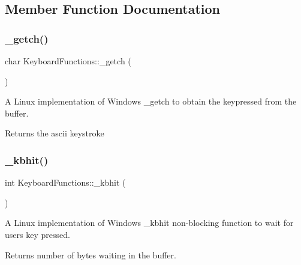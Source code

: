\subsection{Member Function Documentation}
\mbox{\label{class_keyboard_functions_acdaa4ed7d68dd3faf4103fc8112c768b}} 
\subsubsection{\texorpdfstring{\_getch()}{\_getch()}}
{\footnotesize\ttfamily char Keyboard\+Functions\+::\+\_\+getch (\begin{DoxyParamCaption}{ }\end{DoxyParamCaption})\hspace{0.3cm}{\ttfamily [private]}}



A Linux implementation of Windows \+\_\+getch to obtain the keypressed from the buffer. 

\begin{DoxyReturn}{Returns}
the ascii keystroke 
\end{DoxyReturn}
\mbox{\label{class_keyboard_functions_abead7b07445b65c4b01d613823d2f8ce}} 
\subsubsection{\texorpdfstring{\_kbhit()}{\_kbhit()}}
{\footnotesize\ttfamily int Keyboard\+Functions\+::\+\_\+kbhit (\begin{DoxyParamCaption}{ }\end{DoxyParamCaption})\hspace{0.3cm}{\ttfamily [private]}}



A Linux implementation of Windows \+\_\+kbhit non-\/blocking function to wait for user\textquotesingle{}s key pressed. 

\begin{DoxyReturn}{Returns}
number of bytes waiting in the buffer. 
\end{DoxyReturn}
\mbox{\label{class_keyboard_functions_a22c23d2cbca56599768a5ceac94cbb0b}} 

